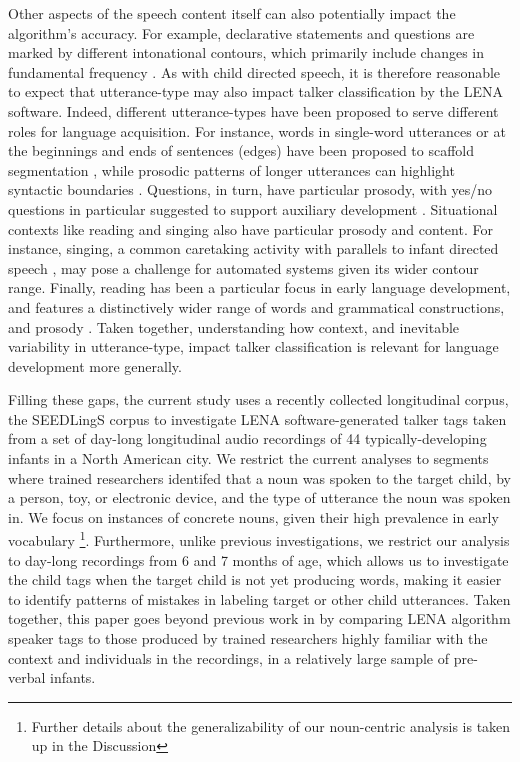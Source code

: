 \documentclass[man,floatsintext]{apa6}
\let\rmarkdownfootnote\footnote%
\def\footnote{\protect\rmarkdownfootnote}
\theoremstyle{definition}
\theoremstyle{definition}
\theoremstyle{definition}
\theoremstyle{remark}
\begin{document}
Other aspects of the speech content itself can also potentially impact
the algorithm's accuracy. For example, declarative statements and
questions are marked by different intonational contours, which primarily
include changes in fundamental frequency \citep{Lieberman1967}. As with
child directed speech, it is therefore reasonable to expect that
utterance-type may also impact talker classification by the LENA
software. Indeed, different utterance-types have been proposed to serve
different roles for language acquisition. For instance, words in
single-word utterances or at the beginnings and ends of sentences
(edges) have been proposed to scaffold segmentation
\citep{Brent2001, Johnson2014a}, while prosodic patterns of longer
utterances can highlight syntactic boundaries
\citetext{\citealp{Nelson1989}; \citealp[see][]{Soderstrom2007}}.
Questions, in turn, have particular prosody, with yes/no questions in
particular suggested to support auxiliary development
\citep{Gleitman1984}. Situational contexts like reading and singing also
have particular prosody and content. For instance, singing, a common
caretaking activity with parallels to infant directed speech
\citep{Trehub1993}, may pose a challenge for automated systems given its
wider contour range. Finally, reading has been a particular focus in
early language development, and features a distinctively wider range of
words and grammatical constructions, and prosody
\citep{Montag2015, Debaryshe1993}. Taken together, understanding how
context, and inevitable variability in utterance-type, impact talker
classification is relevant for language development more generally.

Filling these gaps, the current study uses a recently collected
longitudinal corpus, the SEEDLingS corpus \citep{Bergelson} to
investigate LENA software-generated talker tags taken from a set of
day-long longitudinal audio recordings of 44 typically-developing
infants in a North American city. We restrict the current analyses to
segments where trained researchers identifed that a noun was spoken to
the target child, by a person, toy, or electronic device, and the type
of utterance the noun was spoken in. We focus on instances of concrete
nouns, given their high prevalence in early vocabulary
\citep{Braginsky2017}\footnote{Further details about the generalizability of our noun-centric analysis is taken up in the Discussion}.
Furthermore, unlike previous investigations, we restrict our analysis to
day-long recordings from 6 and 7 months of age, which allows us to
investigate the child tags when the target child is not yet producing
words, making it easier to identify patterns of mistakes in labeling
target or other child utterances. Taken together, this paper goes beyond
previous work in by comparing LENA algorithm speaker tags to those
produced by trained researchers highly familiar with the context and
individuals in the recordings, in a relatively large sample of
pre-verbal infants.
\end{document}
